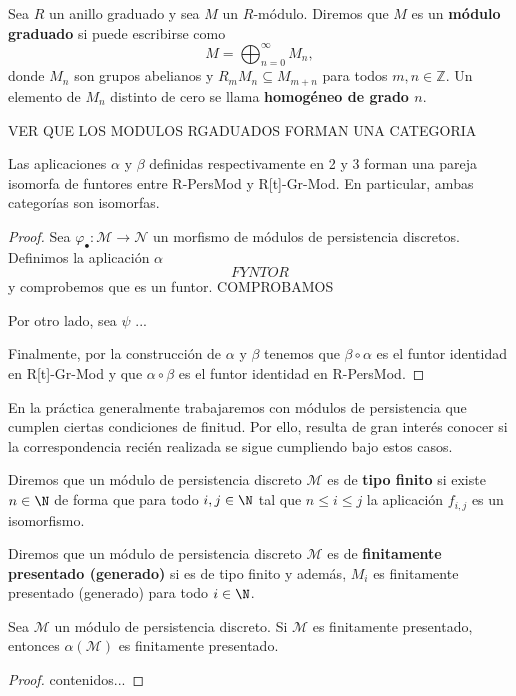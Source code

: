 \begin{definicion}
	Sea \( R \) un anillo graduado y sea \( M \) un \( R \)-módulo. Diremos que \( M \) es un \textbf{módulo graduado} si puede escribirse como
	\[
	M = \bigoplus_{n=0}^{\infty} M_n,
	\]
	donde \( M_n \) son grupos abelianos y \( R_m M_n \subseteq M_{m+n} \) para todos \( m, n \in \mathbb{Z} \). Un elemento de \( M_n \) distinto de cero se llama \textbf{homogéneo de grado \( n \)}.
\end{definicion}
VER QUE LOS MODULOS RGADUADOS FORMAN UNA CATEGORIA
\begin{lema}
	Las aplicaciones \(\alpha\) y \(\beta\) definidas respectivamente en 2 y 3 forman una pareja isomorfa de funtores entre R-PersMod y R[t]-Gr-Mod. En particular, ambas categorías son isomorfas.
\end{lema}
\begin{proof}
	Sea \(\varphi_\bullet : \mathcal{M} \to \mathcal{N}\) un morfismo de módulos de persistencia discretos. Definimos la aplicación \(\alpha\)
	\[FYNTOR\]
	y comprobemos que es un funtor. COMPROBAMOS
	
	Por otro lado, sea \(\psi\) ...
	
	Finalmente, por la construcción de \(\alpha\) y \(\beta\) tenemos que \(\beta \circ \alpha\) es el funtor identidad en R[t]-Gr-Mod y que \(\alpha \circ \beta\) es el funtor identidad en R-PersMod.
\end{proof}

En la práctica generalmente trabajaremos con módulos de persistencia que cumplen ciertas condiciones de finitud. Por ello, resulta de gran interés conocer si la correspondencia recién realizada se sigue cumpliendo bajo estos casos.

\begin{definicion}
	Diremos que un módulo de persistencia discreto \(\mathcal{M}\) es de \textbf{tipo finito} si existe \(n \in \N\) de forma que para todo \(i,j \in \N\) tal que \(n \leq i \leq j\) la aplicación \(f_{i,j}\) es un isomorfismo.
\end{definicion}

\begin{definicion}
	Diremos que un módulo de persistencia discreto \(\mathcal{M}\) es de \textbf{finitamente presentado (generado)} si es de tipo finito y además, \(M_i\) es finitamente presentado (generado) para todo \(i \in \N\).
\end{definicion}

\begin{lema}
	Sea \(\mathcal{M}\) un módulo de persistencia discreto. Si \(\mathcal{M}\) es finitamente presentado, entonces \(\alpha(\mathcal{M})\) es finitamente presentado.
\end{lema}
\begin{proof}
	contenidos...
\end{proof}

